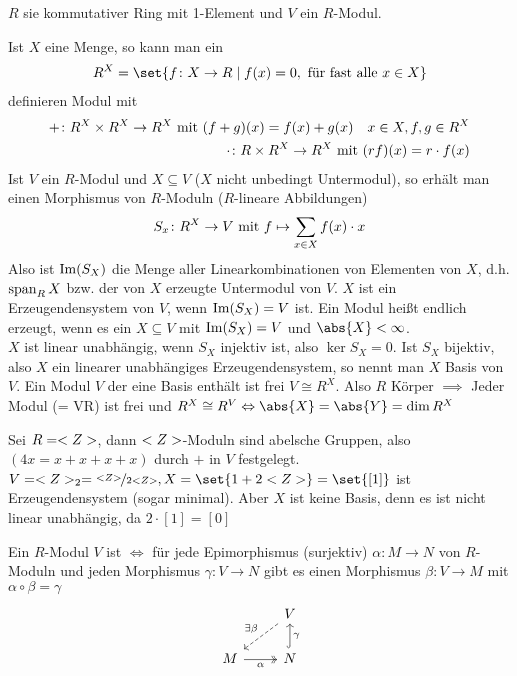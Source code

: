 $R$ sie kommutativer Ring mit 1-Element und $V$ ein $R$-Modul.
\begin{erinnerung}
	Ist $X$ eine Menge, so kann man ein
	\begin{align*}
		R^X = \set{f\colon X \to R \mid f(x) = 0, \text{ für fast alle }x \in X}
	\end{align*}
	definieren Modul mit
	\begin{align*}
		+ \colon R^X \times R^X \to R^X \mit (f+g)(x) = f(x)+g(x)\quad x \in X, f,g \in R^X\\
		\cdot\colon R \times R^X \to R^X \mit (rf)(x) = r\cdot f(x)
	\end{align*}
	Ist $V$ ein $R$-Modul und $X \subseteq V$ ($X$ nicht unbedingt Untermodul), so erhält man einen Morphismus von $R$-Moduln ($R$-lineare Abbildungen)
	\begin{align*}
		S_x\colon R^X \to V \mit f \mapsto \sum_{x\in X}f(x)\cdot x
	\end{align*}
	Also ist $\Image(S_X)$ die Menge aller Linearkombinationen von Elementen von $X$, d.h. $\Span_R X$ bzw. der von $X$ erzeugte Untermodul von $V$. $X$ ist ein Erzeugendensystem von $V$, wenn $\Image(S_X) = V$ ist. Ein Modul heißt endlich erzeugt, wenn es ein $X \subseteq V$ mit $\Image(S_X) = V$ und $\abs{X} < \infty$.\\
	$X$ ist linear unabhängig, wenn $S_X$ injektiv ist, also $\ker S_X = 0$. Ist $S_X$ bijektiv, also $X$ ein linearer unabhängiges Erzeugendensystem, so nennt man $X$ Basis von $V$. Ein Modul $V$ der eine Basis enthält ist frei $V \cong R^X$. Also $R$ Körper $\implies$ Jeder Modul (= VR) ist frei und $R^X \cong R^V \Leftrightarrow \abs{X} = \abs{Y} = \dim R^X$
\end{erinnerung}
\begin{example}
	Sei $R = \Z$, dann $\Z$-Moduln sind abelsche Gruppen, also $(4x = x+x+x+x)$ durch $+$ in $V$ festgelegt. $V = \Z_2 = \lnkset{\Z}{2 \Z}, X = \set{1 + 2\Z} = \set{[1]}$ ist Erzeugendensystem (sogar minimal). Aber $X$ ist keine Basis, denn es ist nicht linear unabhängig, da $2 \cdot [1] = [0]$
\end{example}
\begin{definition}
	Ein $R$-Modul $V$ ist  $\Leftrightarrow$ für jede Epimorphismus (surjektiv) $\alpha \colon M \to N$ von $R$-Moduln und jeden Morphismus $\gamma \colon V \to N$ gibt es einen Morphismus $\beta \colon V \to M$ mit $\alpha \circ \beta = \gamma$
	\[
		\begin{tikzcd}
		& V \arrow[ld, "\exists \beta"', dashed] \\
		M \arrow[r, "\alpha"', two heads] & N \arrow[u, "\gamma"', hook]          
		\end{tikzcd}
	\]
\end{definition}
